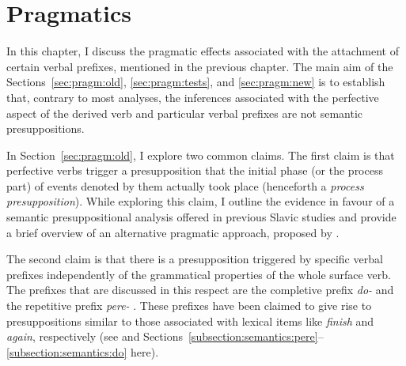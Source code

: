 
\chapter{Pragmatics} %
\label{Chapter6}
In this chapter, I discuss the pragmatic effects associated with the attachment of certain verbal prefixes, mentioned in the previous chapter. The main aim of the Sections~\ref{sec:pragm:old}, \ref{sec:pragm:tests}, and \ref{sec:pragm:new} is to establish that, contrary to most analyses, the inferences associated with the perfective aspect of the derived verb and particular verbal prefixes are not semantic presuppositions. 

In Section~\ref{sec:pragm:old}, I explore two common claims. The first claim is that perfective verbs  trigger a presupposition that the initial phase (or the process part) of events denoted by them actually took place (henceforth a \textit{process presupposition}). While exploring this claim, I outline the evidence in favour of a semantic presuppositional analysis offered in previous Slavic studies and provide a brief overview of an alternative pragmatic approach, proposed by \citet{Gronn:04, Gronn:06}.

The second claim is that there is a presupposition triggered by specific verbal prefixes independently of the grammatical properties of the whole surface verb. The prefixes that are discussed in this respect are the completive  prefix \textit{do-}   and the repetitive  prefix \textit{pere-}  . These prefixes have been claimed to give rise to presuppositions similar to those associated with lexical items like \textit{finish} and \textit{again}, respectively (see \citealt{Kagan:book} and Sections~\ref{subsection:semantics:pere}--\ref{subsection:semantics:do} here).

